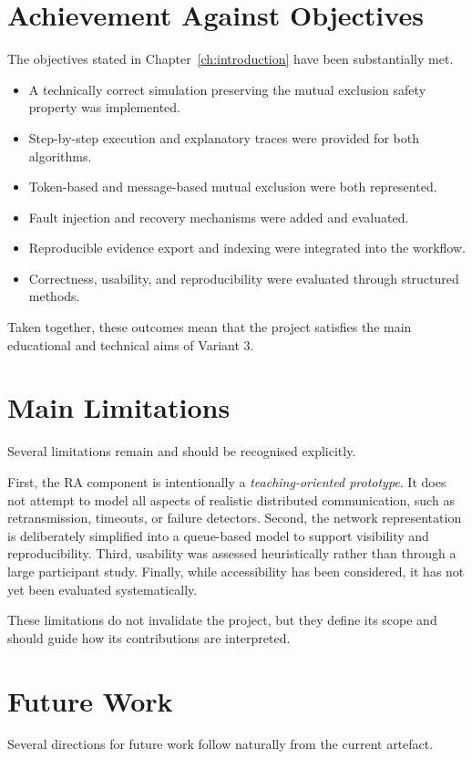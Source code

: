 \section{Achievement Against Objectives}
The objectives stated in Chapter~\ref{ch:introduction} have been substantially met.

\begin{itemize}
  \item A technically correct simulation preserving the mutual exclusion safety property was implemented.
  \item Step-by-step execution and explanatory traces were provided for both algorithms.
  \item Token-based and message-based mutual exclusion were both represented.
  \item Fault injection and recovery mechanisms were added and evaluated.
  \item Reproducible evidence export and indexing were integrated into the workflow.
  \item Correctness, usability, and reproducibility were evaluated through structured methods.
\end{itemize}

Taken together, these outcomes mean that the project satisfies the main educational and technical aims of Variant 3.

\section{Main Limitations}
Several limitations remain and should be recognised explicitly.

First, the RA component is intentionally a \emph{teaching-oriented prototype}. It does not attempt to model all aspects of realistic distributed communication, such as retransmission, timeouts, or failure detectors. Second, the network representation is deliberately simplified into a queue-based model to support visibility and reproducibility. Third, usability was assessed heuristically rather than through a large participant study. Finally, while accessibility has been considered, it has not yet been evaluated systematically.

These limitations do not invalidate the project, but they define its scope and should guide how its contributions are interpreted.

\section{Future Work}
Several directions for future work follow naturally from the current artefact.

